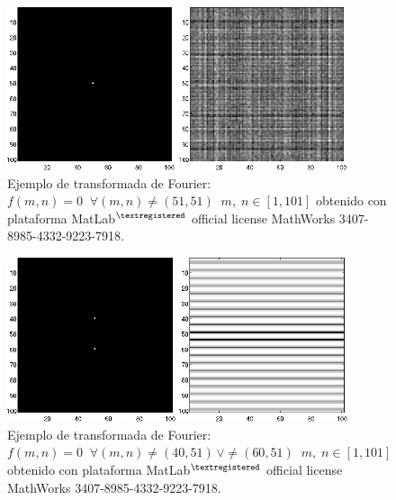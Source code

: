 \begin{center}
\begin{figure} [!h]

\centering
\includegraphics[width=10cm]{Figuras/Fig2_3.png}
   
\caption{Ejemplo de transformada de Fourier: $f(m, n) = 0 \; \; \forall (m, n) \neq (51, 51) \; \;  m, \; n \in [1, 101]$
         obtenido con plataforma MatLab$^{\textregistered}$ official license MathWorks 3407-8985-4332-9223-7918.}
\label{Fig2_3}

\end{figure}
\end{center}

\vspace{1.0cm}

\begin{center}
\begin{figure} [!h]

\centering
\includegraphics[width=10cm]{Figuras/Fig2_4.png}
   
\caption{Ejemplo de transformada de Fourier: $f(m, n) = 0 \; \; \forall (m, n) \neq (40, 51) \, \vee \neq (60, 51) \; \;  m, \; n \in [1, 101]$
         obtenido con plataforma MatLab$^{\textregistered}$ official license MathWorks 3407-8985-4332-9223-7918.}
\label{Fig2_4}

\end{figure}
\end{center}

\vspace{1.0cm}

